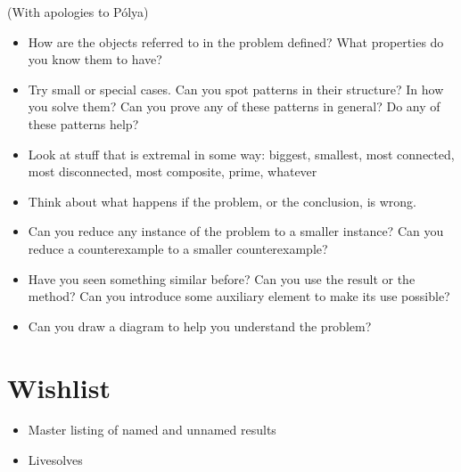 \documentclass{amsart}
\begin{document}
(With apologies to P\'olya)
\begin{itemize}
  \item How are the objects referred to in the problem defined? What properties
    do you know them to have?
  \item Try small or special cases. Can you spot patterns in their structure? In
    how you solve them? Can you prove any of these patterns in general? Do any
    of these patterns help?
  \item Look at stuff that is extremal in some way: biggest, smallest, most
    connected, most disconnected, most composite, prime, whatever
  \item Think about what happens if the problem, or the conclusion, is wrong.
  \item Can you reduce any instance of the problem to a smaller instance? 
    Can you reduce a counterexample to a smaller counterexample?
  \item Have you seen something similar before? Can you use the result or the
    method? Can you introduce some auxiliary element to make its use possible?
  \item Can you draw a diagram to help you understand the problem?
\end{itemize}
\part{Wishlist}
  \begin{itemize}
    \item Master listing of named and unnamed results
    \item Livesolves
  \end{itemize}
\end{document}
